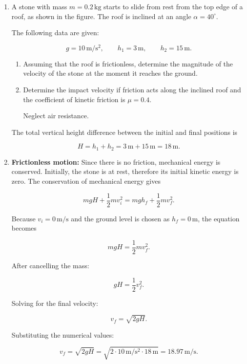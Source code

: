 \documentclass[t,aspectratio=169]{beamer}
\begin{document}
\begin{frame}
\begin{enumerate}
\begin{center}
\begin{tikzpicture}[scale=0.9, >=stealth]
\end{tikzpicture}
\end{center}

\pagebreak
\begin{enumerate}

\item A stone with mass $m = 0.2\,\mathrm{kg}$ starts to slide from rest from the top edge of a roof, as shown in the figure. The roof is inclined at an angle $\alpha = 40^\circ$.

The following data are given:

$$g = 10\,\mathrm{m/s^2}, \qquad h_1 = 3\,\mathrm{m}, \qquad h_2 = 15\,\mathrm{m}.$$

\begin{enumerate}
\item[(a)] Assuming that the roof is frictionless, determine the magnitude of the velocity of the stone at the moment it reaches the ground.

\item[(b)] Determine the impact velocity if friction acts along the inclined roof and the coefficient of kinetic friction is $\mu = 0.4$.

Neglect air resistance.
\end{enumerate}

The total vertical height difference between the initial and final positions is

$$H = h_1 + h_2 = 3\,\mathrm{m} + 15\,\mathrm{m} = 18\,\mathrm{m}.$$

\item[(a)] \textbf{Frictionless motion:} Since there is no friction, mechanical energy is conserved. Initially, the stone is at rest, therefore its initial kinetic energy is zero. The conservation of mechanical energy gives

$$m g H + \frac{1}{2} m v_i^2 = m g h_f + \frac{1}{2} m v_f^2.$$

Because $v_i = 0\,\mathrm{m/s}$ and the ground level is chosen as $h_f = 0\,\mathrm{m}$, the equation becomes

$$m g H = \frac{1}{2} m v_f^2.$$

After cancelling the mass:

$$g H = \frac{1}{2} v_f^2.$$

\pagebreak
Solving for the final velocity:

$$v_f = \sqrt{2 g H}.$$

Substituting the numerical values:

$$v_f = \sqrt{2 g H} = \sqrt{2 \cdot 10\,\mathrm{m/s^2} \cdot 18\,\mathrm{m}}= 18.97\,\mathrm{m/s}.$$


\end{enumerate}
\end{enumerate}
\end{frame}
\end{document}
